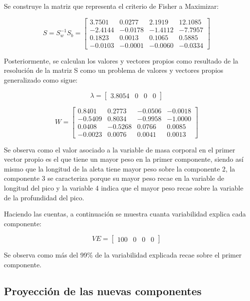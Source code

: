 \documentclass[11pt, letterpaper]{article}
\begin{document}
Se construye la matriz que representa el criterio de Fisher a Maximizar:

$$S = S_w^{-1}S_b = 
\begin{bmatrix}
3.7501 & 0.0277 & 2.1919 & 12.1085 \\
-2.4144 & -0.0178 & -1.4112 & -7.7957 \\
0.1823 & 0.0013 & 0.1065 & 0.5885 \\
-0.0103 & -0.0001 & -0.0060 & -0.0334
\end{bmatrix}
$$

Posteriormente, se calculan los valores y vectores propios como resultado de la resolución de la matriz S como un problema de valores y vectores propios generalizado como sigue:

$$\lambda = 
\begin{bmatrix}
	3.8054 &
	0 &
	0 &
	0 
\end{bmatrix}
$$

$$ W = 
\begin{bmatrix}
0.8401 & 0.2773 & -0.0506 & -0.0018 \\
-0.5409 & 0.8034 & -0.9958 & -1.0000 \\
0.0408 & -0.5268 & 0.0766 & 0.0085 \\
-0.0023 & 0.0076 & 0.0041 & 0.0013
\end{bmatrix}
$$

Se observa como el valor asociado a la variable de masa corporal en el primer vector propio es el que tiene un mayor peso en la primer componente, siendo así mismo que la longitud de la aleta tiene mayor peso sobre la componente 2, la componente 3 se caracteriza porque su mayor peso recae en la variable de longitud del pico y la variable 4 indica que el mayor peso recae sobre la variable de la profundidad del pico.

Haciendo las cuentas, a continuación se muestra cuanta variabilidad explica cada componente:

$$VE = 
\begin{bmatrix}
	100 &
	0 &
	0 &
	0 
\end{bmatrix}
$$



Se observa como más del 99\% de la variabilidad explicada recae sobre el primer componente.


\newpage

\subsection{Proyección de las nuevas componentes}
\end{document}
